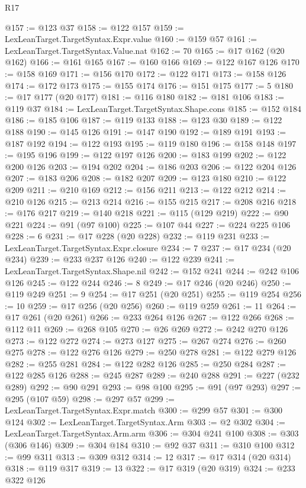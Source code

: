 \begin{lexlean}{R17}
\begin{coremodule}
@157 := @123 @37
@158 := @122 @157
@159 := LexLeanTarget.TargetSyntax.Expr.value
@160 := @159 @57
@161 := LexLeanTarget.TargetSyntax.Value.nat
@162 := 70
@165 := @17 @162 (@20 @162)
@166 := @161 @165
@167 := @160 @166
@169 := @122 @167 @126
@170 := @158 @169
@171 := @156 @170
@172 := @122 @171
@173 := @158 @126
@174 := @172 @173
@175 := @155 @174
@176 := @151 @175
@177 := 5
@180 := @17 @177 (@20 @177)
@181 := @116 @180
@182 := @181 @106
@183 := @119 @37
@184 := LexLeanTarget.TargetSyntax.Shape.cons
@185 := @152 @184
@186 := @185 @106
@187 := @119 @133
@188 := @123 @30
@189 := @122 @188
@190 := @145 @126
@191 := @147 @190
@192 := @189 @191
@193 := @187 @192
@194 := @122 @193
@195 := @119 @180
@196 := @158 @148
@197 := @195 @196
@199 := @122 @197 @126
@200 := @183 @199
@202 := @122 @200 @126
@203 := @194 @202
@204 := @186 @203
@206 := @122 @204 @126
@207 := @183 @206
@208 := @182 @207
@209 := @123 @180
@210 := @122 @209
@211 := @210 @169
@212 := @156 @211
@213 := @122 @212
@214 := @210 @126
@215 := @213 @214
@216 := @155 @215
@217 := @208 @216
@218 := @176 @217
@219 := @140 @218
@221 := @115 (@129 @219)
@222 := @90 @221
@224 := @91 (@97 @100)
@225 := @107 @44
@227 := @224 @225 @106
@228 := 6
@231 := @17 @228 (@20 @228)
@232 := @119 @231
@233 := LexLeanTarget.TargetSyntax.Expr.closure
@234 := 7
@237 := @17 @234 (@20 @234)
@239 := @233 @237 @126
@240 := @122 @239
@241 := LexLeanTarget.TargetSyntax.Shape.nil
@242 := @152 @241
@244 := @242 @106 @126
@245 := @122 @244
@246 := 8
@249 := @17 @246 (@20 @246)
@250 := @119 @249
@251 := 9
@254 := @17 @251 (@20 @251)
@255 := @119 @254
@256 := 10
@259 := @17 @256 (@20 @256)
@260 := @119 @259
@261 := 11
@264 := @17 @261 (@20 @261)
@266 := @233 @264 @126
@267 := @122 @266
@268 := @112 @11
@269 := @268 @105
@270 := @26 @269
@272 := @242 @270 @126
@273 := @122 @272
@274 := @273 @127
@275 := @267 @274
@276 := @260 @275
@278 := @122 @276 @126
@279 := @250 @278
@281 := @122 @279 @126
@282 := @255 @281
@284 := @122 @282 @126
@285 := @250 @284
@287 := @122 @285 @126
@288 := @245 @287
@289 := @240 @288
@291 := @227 (@232 @289)
@292 := @90 @291
@293 := @98 @100
@295 := @91 (@97 @293)
@297 := @295 (@107 @59)
@298 := @297 @57
@299 := LexLeanTarget.TargetSyntax.Expr.match
@300 := @299 @57
@301 := @300 @124
@302 := LexLeanTarget.TargetSyntax.Arm
@303 := @2 @302
@304 := LexLeanTarget.TargetSyntax.Arm.arm
@306 := @304 @241 @100
@308 := @303 (@306 @146)
@309 := @304 @184
@310 := @92 @37
@311 := @310 @100
@312 := @99 @311
@313 := @309 @312
@314 := 12
@317 := @17 @314 (@20 @314)
@318 := @119 @317
@319 := 13
@322 := @17 @319 (@20 @319)
@324 := @233 @322 @126

\end{coremodule}
\end{lexlean}
